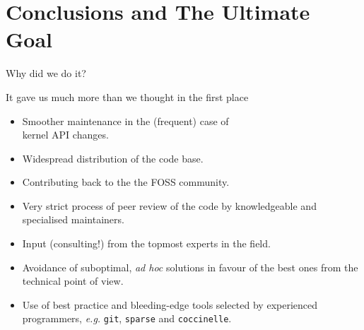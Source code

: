 \documentclass[compress,red]{beamer}
\begin{document}
\section{Conclusions and The Ultimate Goal}

\begin{frame}{Why did we do it?}

It gave us much more than we thought in the first place
\begin{itemize}
\pause
\item Smoother maintenance in the (frequent) case of\\
	kernel API changes.
\item Widespread distribution of the code base.
\item Contributing back to the the FOSS community.
\pause \color{red}
\item Very strict process of peer review of the code by knowledgeable
    and specialised maintainers.
\pause
\item Input (consulting!) from the topmost experts in the field.
\pause
\item Avoidance of suboptimal, \emph{ad hoc} solutions in favour of the
    best ones from the technical point of view.
\pause
\item Use of best practice and bleeding-edge tools selected by
    experienced programmers, \emph{e.g.} \texttt{git}, \texttt{sparse}
    and \texttt{coccinelle}.
\end{itemize}
\end{frame}
\end{document}
